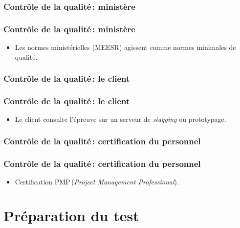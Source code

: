 					\subsubsection{Contrôle de la qualité\,: ministère} 
							\begin{frame}[allowframebreaks]
							\frametitle{Contrôle de la qualité\,: ministère}
                        			
							\begin{itemize}
							\item Les normes ministérielles (MEESR) agissent comme normes minimales de qualité.
							\end{itemize}						
					\end{frame}	
					\subsubsection{Contrôle de la qualité\,: le client} 
							\begin{frame}[allowframebreaks]
							\frametitle{Contrôle de la qualité\,: le client}
                        			
							\begin{itemize}
							\item Le client consulte l’épreuve sur un serveur de \textit{stagging} ou prototypage.
							\end{itemize}						
					\end{frame}	
					
					\subsubsection{Contrôle de la qualité\,: certification du personnel} 
							\begin{frame}[allowframebreaks]
							\frametitle{Contrôle de la qualité\,: certification du personnel}
                        			
							\begin{itemize}
							\item Certification PMP\textregistered\,(\textit{Project Management Professional}).
							\end{itemize}						
					\end{frame}	
	
	
	\section{Préparation du test} 
	
		
		
